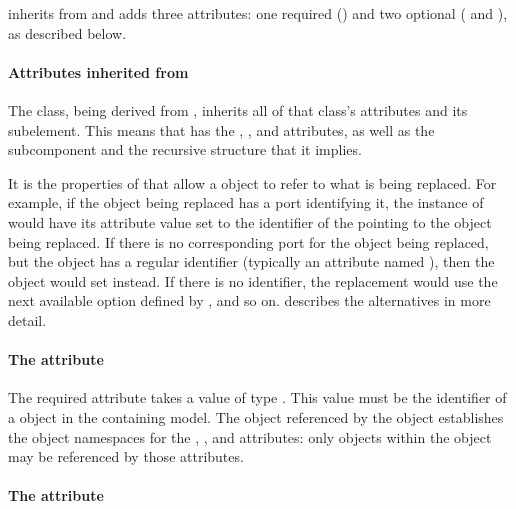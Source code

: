 \ReplacedElement inherits from \SBaseRef and adds three attributes: one
required () and two optional ( and
), as described below.


\paragraph{Attributes inherited from }

The \ReplacedElement class, being derived from \SBaseRef, inherits all
of that class's attributes and its subelement.  This means that
\ReplacedElement has the , , 
and  attributes, as well as the subcomponent
 and the recursive structure that it implies.

It is the properties of \SBaseRef that allow a \ReplacedElement object
to refer to what is being replaced.  For example, if the object being
replaced has a port identifying it, the instance of \ReplacedElement
would have its  attribute value set to the identifier of
the \Port pointing to the object being replaced.  If there is no
corresponding port for the object being replaced, but the object has a
regular identifier (typically an attribute named ), then the
\ReplacedElement object would set  instead.  If there is no
identifier, the replacement would use the next available option defined
by \SBaseRef, and so on.   describes the
alternatives in more detail.


\paragraph{The \fixttspace{} attribute}
\label{replacedelement-submodelref}

The required attribute  takes a value of type
.  This value must be the identifier of a \Submodel
object in the containing model.  The \Model object referenced by the
\Submodel object establishes the object namespaces for the
, ,  and 
attributes: only objects within the \Model object may be referenced by
those attributes.


\paragraph{The \fixttspace{} attribute}
\label{replacedelement-deletion}

